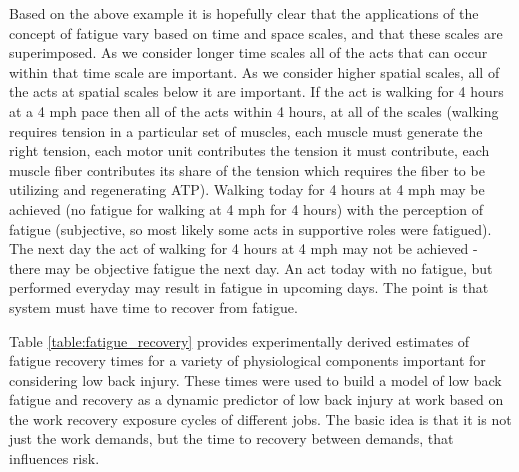 Based on the above example it is hopefully clear that the applications of the concept of fatigue vary based on time and space scales, and that these scales are superimposed. As we consider longer time scales all of the acts that can occur within that time scale are important. As we consider higher spatial scales, all of the acts at spatial scales below it are important. If the act is walking for 4 hours at a 4 mph pace then all of the acts within 4 hours, at all of the scales (walking requires tension in a particular set of muscles, each muscle must generate the right tension, each motor unit contributes the tension it must contribute, each muscle fiber contributes its share of the tension which requires the fiber to be utilizing and regenerating ATP). Walking today for 4 hours at 4 mph may be achieved (no fatigue for walking at 4 mph for 4 hours) with the perception of fatigue (subjective, so most likely some acts in supportive roles were fatigued). The next day the act of walking for 4 hours at 4 mph may not be achieved - there may be objective fatigue the next day. An act today with no fatigue, but performed everyday may result in fatigue in upcoming days. The point is that system must have time to recover from fatigue. 

Table \ref{table:fatigue_recovery} provides experimentally derived estimates of fatigue recovery times for a variety of physiological components important for considering low back injury. These times were used to build a model of low back fatigue and recovery as a dynamic predictor of low back injury at work based on the work recovery exposure cycles of different jobs. The basic idea is that it is not just the work demands, but the time to recovery between demands, that influences risk.


